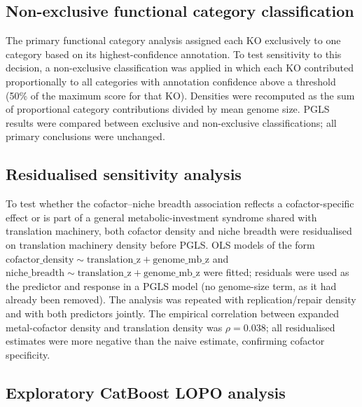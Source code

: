 \documentclass[times]{zHenriquesLab-StyleBioRxiv}
\begin{document}
\subsection{Non-exclusive functional category classification}

The primary functional category analysis assigned each KO exclusively to one
category based on its highest-confidence annotation. To test sensitivity to this
decision, a non-exclusive classification was applied in which each KO contributed
proportionally to all categories with annotation confidence above a threshold
(50\% of the maximum score for that KO). Densities were recomputed as the sum of
proportional category contributions divided by mean genome size. PGLS results
were compared between exclusive and non-exclusive classifications; all primary
conclusions were unchanged.

\subsection{Residualised sensitivity analysis}

To test whether the cofactor--niche breadth association reflects a cofactor-specific
effect or is part of a general metabolic-investment syndrome shared with
translation machinery, both cofactor density and niche breadth were residualised
on translation machinery density before PGLS. OLS models of the form
$\text{cofactor\_density} \sim \text{translation\_z} + \text{genome\_mb\_z}$
and $\text{niche\_breadth} \sim \text{translation\_z} + \text{genome\_mb\_z}$
were fitted; residuals were used as the predictor and response in a PGLS model
(no genome-size term, as it had already been removed). The analysis was repeated
with replication/repair density and with both predictors jointly. The empirical
correlation between expanded metal-cofactor density and translation density was
$\rho = 0.038$; all residualised estimates were more negative than the naive
estimate, confirming cofactor specificity.


\subsection{Exploratory CatBoost LOPO analysis}
\label{ss:catboost_methods}
\end{document}
